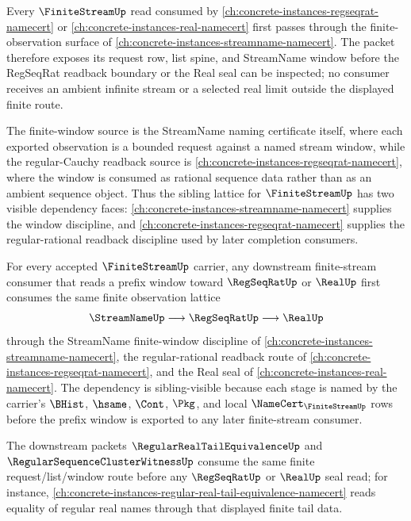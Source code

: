 Every $\FiniteStreamUp$ read consumed by \autoref{ch:concrete-instances-regseqrat-namecert} or \autoref{ch:concrete-instances-real-namecert} first passes through the finite-observation surface of \autoref{ch:concrete-instances-streamname-namecert}. The packet therefore exposes its request row, list spine, and StreamName window before the RegSeqRat readback boundary or the Real seal can be inspected; no consumer receives an ambient infinite stream or a selected real limit outside the displayed finite route.

The finite-window source is the StreamName naming certificate itself, where each exported observation is a bounded request against a named stream window, while the regular-Cauchy readback source is \autoref{ch:concrete-instances-regseqrat-namecert}, where the window is consumed as rational sequence data rather than as an ambient sequence object. Thus the sibling lattice for $\FiniteStreamUp$ has two visible dependency faces: \autoref{ch:concrete-instances-streamname-namecert} supplies the window discipline, and \autoref{ch:concrete-instances-regseqrat-namecert} supplies the regular-rational readback discipline used by later completion consumers.

\begin{theorem}
\label{thm:finite-stream-sibling-dependency-route}
For every accepted $\FiniteStreamUp$ carrier, any downstream finite-stream consumer that reads a prefix window toward $\RegSeqRatUp$ or $\RealUp$ first consumes the same finite observation lattice
$$
\StreamNameUp \longrightarrow \RegSeqRatUp \longrightarrow \RealUp
$$
through the StreamName finite-window discipline of \autoref{ch:concrete-instances-streamname-namecert}, the regular-rational readback route of \autoref{ch:concrete-instances-regseqrat-namecert}, and the Real seal of \autoref{ch:concrete-instances-real-namecert}. The dependency is sibling-visible because each stage is named by the carrier's $\BHist$, $\hsame$, $\Cont$, $\Pkg$, and local $\NameCert_{\FiniteStreamUp}$ rows before the prefix window is exported to any later finite-stream consumer.
\end{theorem}

The downstream packets $\RegularRealTailEquivalenceUp$ and $\RegularSequenceClusterWitnessUp$ consume the same finite request/list/window route before any $\RegSeqRatUp$ or $\RealUp$ seal read; for instance, \autoref{ch:concrete-instances-regular-real-tail-equivalence-namecert} reads equality of regular real names through that displayed finite tail data.
